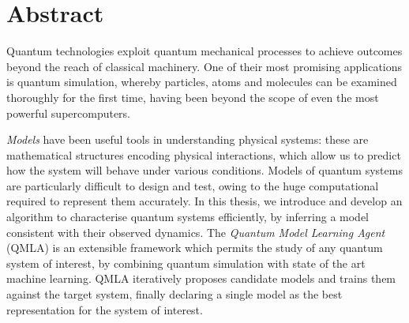 \chapter*{Abstract}



Quantum technologies exploit quantum mechanical processes to achieve outcomes beyond the reach of classical machinery.
One of their most promising applications is quantum simulation, 
    whereby particles, atoms and molecules can be examined thoroughly for the first time, 
    having been beyond the scope of even the most powerful supercomputers. 
\par 
\emph{Models} have been useful tools in understanding physical systems:
    these are mathematical structures encoding physical interactions,
    which allow us to predict how the system will behave under various conditions. 
Models of quantum systems are particularly difficult to design and test, 
    owing to the huge computational required to represent them accurately.
In this thesis, we introduce and develop an algorithm to characterise quantum systems efficiently, 
    by inferring a model consistent with their observed dynamics.
The \emph{Quantum Model Learning Agent} (QMLA) is an extensible framework which permits 
    the study of any quantum system of interest, 
    by combining quantum simulation with state of the art machine learning.
QMLA iteratively proposes candidate models and trains them against the target system,
    finally declaring a single model as the best representation for the system of interest.  
\par 

